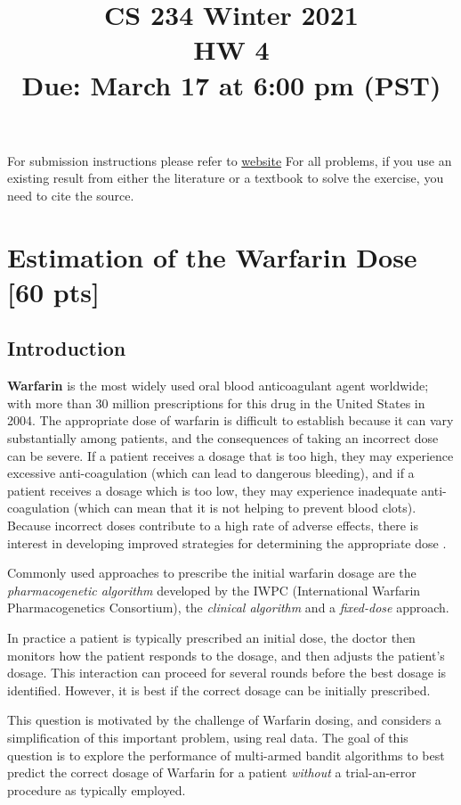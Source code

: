 \documentclass[11pt]{article}
\title{CS 234 Winter 2021 \\ HW 4\\
Due: March 17 at 6:00 pm (PST)}
\date{}
\begin{document}
	\maketitle
\noindent For submission instructions please refer to \href{http://web.stanford.edu/class/cs234/assignments.html}{website}
For all problems, if you use an existing result from either the literature or a textbook to solve the exercise, you need to cite the source.

\section{Estimation of the Warfarin Dose [60 pts]}

\subsection{Introduction}\label{sec:intro}
\textbf{Warfarin}
is the most widely used oral blood anticoagulant agent worldwide; 
with more than 30 million prescriptions for this drug in the United States in 2004. 
The appropriate dose of warfarin is difficult to establish because it can vary substantially among patients,
and the consequences of taking an incorrect dose can be severe.  If a patient receives a dosage that is too high, they may experience excessive anti-coagulation (which can lead to dangerous bleeding), and if a patient receives a dosage which is too low, they may experience inadequate anti-coagulation (which can mean that it is not helping to prevent blood clots). Because incorrect doses contribute to a high rate of adverse effects, there is interest in developing improved strategies for determining the appropriate dose \citep{international2009estimation}. 

\noindent Commonly used approaches to prescribe the initial warfarin dosage are the \textit{pharmacogenetic algorithm} developed by the IWPC (International Warfarin Pharmacogenetics Consortium), the \textit{clinical algorithm} and a \textit{fixed-dose} approach.

\noindent In practice a patient is typically prescribed an initial dose, the doctor then monitors how the patient responds to the dosage, and then adjusts the patient's dosage. This interaction can proceed for several rounds before the best dosage is identified. However, it is best if the correct dosage can be initially prescribed.

\noindent This question is motivated by the challenge of Warfarin dosing, and considers a simplification of this 
important problem, using real data.  The goal of this question is to explore the performance of multi-armed bandit algorithms to best predict the correct dosage of Warfarin for a patient \emph{without} a trial-an-error procedure as typically employed. %
\end{document}
